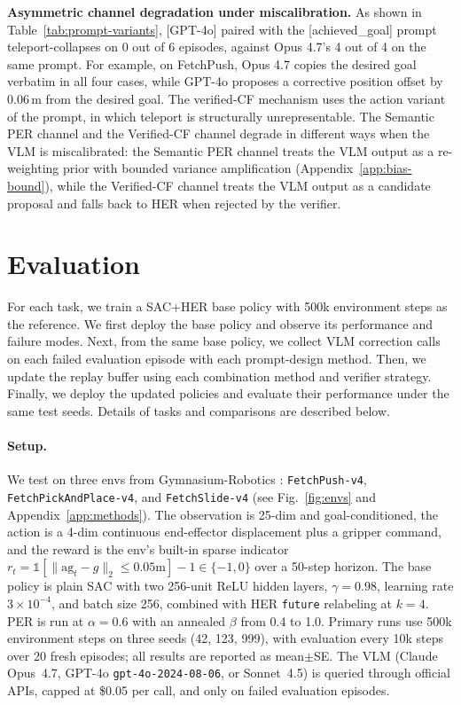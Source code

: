 \documentclass{article}
\begin{document}
\textbf{Asymmetric channel degradation under miscalibration.}
As shown in Table~\ref{tab:prompt-variants}, [GPT-4o] paired with
the [achieved\_goal] prompt teleport-collapses on 0 out of 6
episodes, against Opus 4.7's 4 out of 4 on the same prompt. For
example, on FetchPush, Opus 4.7 copies the desired goal verbatim
in all four cases, while GPT-4o proposes a corrective position
offset by 0.06\,m from the desired goal. The verified-CF mechanism
uses the action variant of the prompt, in which teleport is
structurally unrepresentable. The Semantic PER channel and the
Verified-CF channel degrade in different ways when the VLM is
miscalibrated: the Semantic PER channel treats the VLM output as a
re-weighting prior with bounded variance amplification
(Appendix~\ref{app:bias-bound}), while the Verified-CF channel
treats the VLM output as a candidate proposal and falls back to
HER when rejected by the verifier.

\section{Evaluation}
\label{sec:exp}

For each task, we train a SAC+HER
\citep{haarnoja2018sac,andrychowicz2017her} base policy with 500k
environment steps as the reference. We first deploy the base policy
and observe its performance and failure modes. Next, from the same
base policy, we collect VLM correction calls on each failed
evaluation episode with each prompt-design method. Then, we update
the replay buffer using each combination method and verifier
strategy. Finally, we deploy the updated policies and evaluate
their performance under the same test seeds. Details of tasks and
comparisons are described below.

\paragraph{Setup.}
We test on three envs from Gymnasium-Robotics
\citep{delazcano2024gymrobotics}: \texttt{FetchPush-v4},
\texttt{FetchPickAndPlace-v4}, and \texttt{FetchSlide-v4} (see
Fig.~\ref{fig:envs} and Appendix~\ref{app:methods}). The
observation is 25-dim and goal-conditioned, the action is a 4-dim
continuous end-effector displacement plus a gripper command, and
the reward is the env's built-in sparse indicator
$r_t=\mathbb{1}[\|\text{ag}_t-g\|_2\!\le\!0.05\text{m}]-1\!\in\!\{-1,0\}$
over a 50-step horizon. The base policy is plain SAC with two
256-unit ReLU hidden layers, $\gamma\!=\!0.98$, learning rate
$3\!\times\!10^{-4}$, and batch size 256, combined with HER
\texttt{future} relabeling at $k\!=\!4$. PER is run at
$\alpha\!=\!0.6$ with an annealed $\beta$ from 0.4 to 1.0. Primary
runs use 500k environment steps on three seeds (42, 123, 999),
with evaluation every 10k steps over 20 fresh episodes; all results
are reported as mean$\pm$SE. The VLM (Claude Opus~4.7, GPT-4o
\texttt{gpt-4o-2024-08-06}, or Sonnet~4.5) is queried through
official APIs, capped at \$0.05 per call, and only on failed
evaluation episodes.
\end{document}
